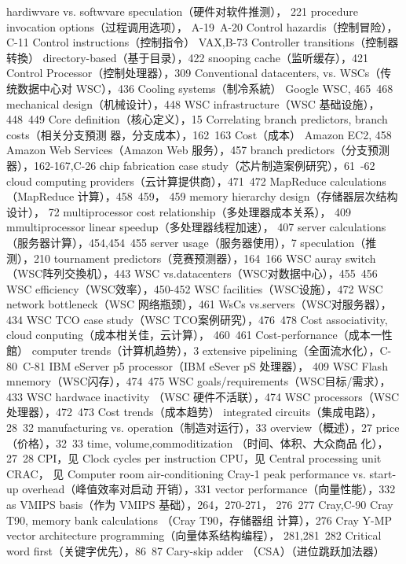 hardiwvare vs. softwvare speculation（硬件对软件推测），
221
procedure invocation options（过程调用选项），
A-19~A-20
Control hazardis（控制冒险），C-11
Control instructions（控制指令）
VAX,B-73
Controller transitions（控制器转換）
directory-based（基于目录），422
snooping cache（监听缓存），421
Control Processor（控制处理器），309
Conventional datacenters, vs. WSCs（传统数据中心对
WSC），436
Cooling systems（制冷系統）
Google WSC, 465~468
mechanical design（机械设计），448
WSC infrastructure（WSC 基础设施），448~449
Core definition（核心定义），15
Correlating branch predictors, branch costs（相关分支預测
器，分支成本），162~163
Cost（成本）
Amazon EC2, 458
Amazon Web Services（Amazon Web 服务），457
branch predictors（分支预测器），162-167,C-26
chip fabrication case study（芯片制造案例研究），61~-62
cloud computing providers（云计算提供商），471~472
MapReduce calculations（MapReduce 计算），458~459，
459
memory hierarchy design（存储器层次结构设计），
72
multiprocessor cost relationship（多处理器成本关系），
409
mmultiprocessor linear speedup（多处理器线程加速），
407
server calculations（服务器计算），454,454~455
server usage（服务器使用），7
speculation（推测），210
tournament predictors（竞赛预测器），164~166
WSC auray switch（WSC阵列交換机），443
WSC vs.datacenters（WSC对数据中心），455~456
WSC efficiency（WSC效率），450-452
WSC facilities（WSC设施），472
WSC network bottleneck（WSC 网络瓶颈），461
WsCs vs.servers（WSC对服务器），434
WSC TCO case study（WSC TCO案例研究），476~478
Cost associativity, cloud conputing（成本柑关佳，云计算），
460~461
Cost-perfornance（成本一性館）
computer trends（计算机趋势），3
extensive pipelining（全面流水化），C-80~C-81
IBM eServer p5 processor（IBM eSever pS 处理器），
409
WSC Flash mnemory（WSC闪存），474~475
WSC goals/requirements（WSC目标/需求），433
WSC hardwace inactivity （WSC 硬件不活联），474
WSC processors（WSC处理器），472~473
Cost trends（成本趋势）
integrated circuits（集成电路），28~32
manufacturing vs. operation（制造对运行），33
overview（概述），27
price（价格），32~33
time, volume,commoditization （时间、体积、大众商品
化），27~28
CPI，见 Clock cycles per instruction
CPU，见 Central processing unit
CRAC， 见 Computer room air-conditioning
Cray-1
peak performance vs. start-up overhead（峰值效率对启动
开销），331
vector performance（向量性能），332
as VMIPS basis（作为 VMIPS 基础），264，270-271，
276~277
Cray,C-90
Cray T90, memory bank calculations （Cray T90，存储器组
计算），276
Cray Y-MP
vector architecture programming（向量体系结构编程），
281,281~282
Critical word first（关键字优先），86~87
Cary-skip adder （CSA）（进位跳跃加法器）
